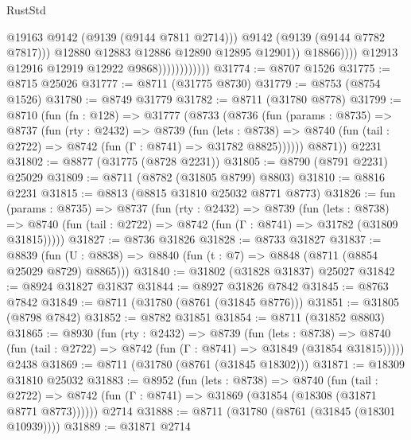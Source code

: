 \begin{lexlean}{RustStd}
\begin{coremodule}
                                            @19163
                                            @9142
                                            (@9139 (@9144 @7811 @2714)))
                                          @9142
                                          (@9139 (@9144 @7782 @7817)))
                                        @12880
                                        @12883
                                        @12886
                                        @12890
                                        @12895
                                        @12901))
                                    @18866))))
                            @12913
                            @12916
                            @12919
                            @12922
                            @9868))))))))))))
@31774 := @8707 @1526
@31775 := @8715 @25026
@31777 := @8711 (@31775 @8730)
@31779 := @8753 (@8754 @1526)
@31780 := @8749 @31779
@31782 := @8711 (@31780 @8778)
@31799 := @8710
    (fun (fn : @128) =>
    @31777
      (@8733
        (@8736
          (fun (params : @8735) =>
          @8737
            (fun (rty : @2432) =>
            @8739
              (fun (lets : @8738) =>
              @8740 (fun (tail : @2722) => @8742 (fun (Γ : @8741) => @31782 @8825))))))
        @8871))
    @2231
@31802 := @8877 (@31775 (@8728 @2231))
@31805 := @8790 (@8791 @2231) @25029
@31809 := @8711 (@8782 (@31805 @8799) @8803)
@31810 := @8816 @2231
@31815 := @8813 (@8815 @31810 @25032 @8771 @8773)
@31826 := fun (params : @8735) =>
  @8737
    (fun (rty : @2432) =>
    @8739
      (fun (lets : @8738) =>
      @8740 (fun (tail : @2722) => @8742 (fun (Γ : @8741) => @31782 (@31809 @31815)))))
@31827 := @8736 @31826
@31828 := @8733 @31827
@31837 := @8839
    (fun (U : @8838) => @8840 (fun (t : @7) => @8848 (@8711 (@8854 @25029 @8729) @8865)))
@31840 := @31802 (@31828 @31837) @25027
@31842 := @8924 @31827 @31837
@31844 := @8927 @31826 @7842
@31845 := @8763 @7842
@31849 := @8711 (@31780 (@8761 (@31845 @8776)))
@31851 := @31805 (@8798 @7842)
@31852 := @8782 @31851
@31854 := @8711 (@31852 @8803)
@31865 := @8930
    (fun (rty : @2432) =>
    @8739
      (fun (lets : @8738) =>
      @8740 (fun (tail : @2722) => @8742 (fun (Γ : @8741) => @31849 (@31854 @31815)))))
    @2438
@31869 := @8711 (@31780 (@8761 (@31845 @18302)))
@31871 := @18309 @31810 @25032
@31883 := @8952
    (fun (lets : @8738) =>
    @8740
      (fun (tail : @2722) =>
      @8742 (fun (Γ : @8741) => @31869 (@31854 (@18308 (@31871 @8771 @8773))))))
    @2714
@31888 := @8711 (@31780 (@8761 (@31845 (@18301 @10939))))
@31889 := @31871 @2714

\end{coremodule}
\end{lexlean}

